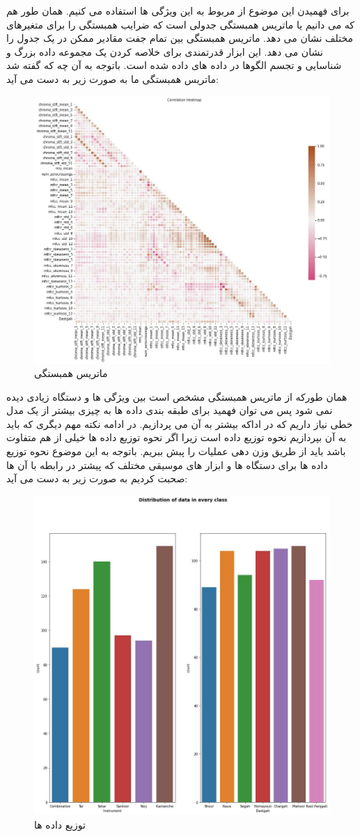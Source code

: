\documentclass{article}
\begin{document}
برای فهمیدن این موضوع از  مربوط به این ویژگی ها استفاده می کنیم.\newline
همان طور هم که می دانیم   یا ماتریس همبستگی جدولی است که ضرایب همبستگی را برای متغیرهای مختلف نشان می دهد. ماتریس همبستگی بین تمام جفت مقادیر ممکن در یک جدول را نشان می دهد. این ابزار قدرتمندی برای خلاصه کردن یک مجموعه داده بزرگ و شناسایی و تجسم الگوها در داده های داده شده است.\newline
باتوجه به آن چه که گفته شد ماتریس همبستگی ما به صورت زیر به دست می آید:
\begin{figure}[h]
	\centering
	\includegraphics[width=0.5\linewidth]{Photo/11}
	\caption[ماتریس همبستگی]{ماتریس همبستگی}
	\label{fig:11}
\end{figure}
\newpage
همان طورکه از ماتریس همبستگی مشخص است بین ویژگی ها و دستگاه  زیادی دیده نمی شود پس می توان فهمید برای طبقه بندی داده ها به چیزی بیشتر از یک مدل خطی نیاز داریم که در اداکه بیشتر به آن می پردازیم.
در ادامه نکته مهم دیگری که باید به آن بپردازیم نحوه توزیع داده است زیرا اگر نحوه توزیع داده ها خیلی از هم متفاوت باشد باید از طریق وزن دهی عملیات را پبش ببریم.
باتوجه به این موضوع نحوه توزیع داده ها برای دستگاه ها و ابزار های موسیقی مختلف که پیشتر در رابطه با آن ها صحبت کردیم به صورت زیر به دست می آید:
\begin{figure}[h]
	\centering
	\includegraphics[width=0.41\linewidth]{Photo/12}
	\caption[توزیع داده ها]{توزیع داده ها}
	\label{fig:12}
\end{figure}
\newpage
\end{document}
